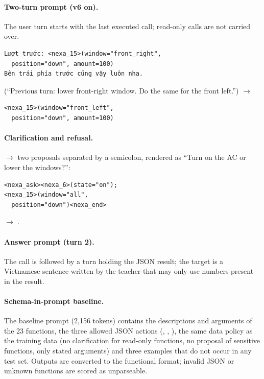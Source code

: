 \paragraph{Two-turn prompt (v6 on).} The user turn starts with the last executed call; read-only calls are not carried over.
\begin{Verbatim}[fontsize=\small]
Lượt trước: <nexa_15>(window="front_right",
  position="down", amount=100)
Bên trái phía trước cũng vậy luôn nha.
\end{Verbatim}
(``Previous turn: lower front-right window. Do the same for the front left.'') $\rightarrow$
\begin{Verbatim}[fontsize=\small]
<nexa_15>(window="front_left",
  position="down", amount=100)
\end{Verbatim}

\paragraph{Clarification and refusal.}
 $\rightarrow$ two proposals separated by a semicolon, rendered as ``Turn on the AC
or lower the windows?'':
\begin{Verbatim}[fontsize=\small]
<nexa_ask><nexa_6>(state="on");
<nexa_15>(window="all",
  position="down")<nexa_end>
\end{Verbatim}
 $\rightarrow$ \code{()}.

\paragraph{Answer prompt (turn 2).} The call is followed by a  turn holding the JSON result; the target is a
Vietnamese sentence written by the teacher that may only use numbers present in the result.

\paragraph{Schema-in-prompt baseline.} The baseline prompt (2,156 tokens) contains the descriptions and arguments of the 23
functions, the three allowed JSON actions (, , ), the same data policy as the training data
(no clarification for read-only functions, no proposal of sensitive functions, only stated arguments) and three examples that
do not occur in any test set. Outputs are converted to the functional format; invalid JSON or unknown functions are scored as
unparseable.

